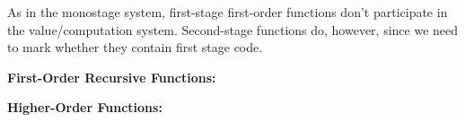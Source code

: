 \documentclass[]{article}
\begin{document}
\begin{abstrsyn}
As in the monostage system, first-stage first-order functions don't participate in the value/computation system.
Second-stage functions do, however, since we need to mark whether they contain first stage code.
\begin{framed}
\noindent\textbf{First-Order Recursive Functions:}
\end{framed}

\begin{framed}
\noindent\textbf{Higher-Order Functions:}
\end{framed}


\end{abstrsyn}
\end{document}
